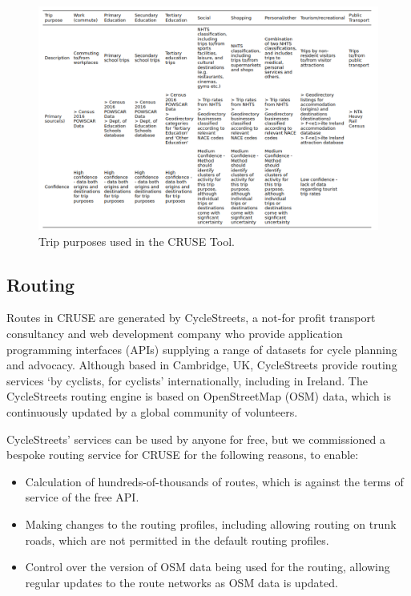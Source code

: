 \documentclass[
  super,
  preprint,
  3p]{elsarticle}
\providecommand{\tightlist}{%
  \setlength{\itemsep}{0pt}\setlength{\parskip}{0pt}}\usepackage{longtable,booktabs,array}
\begin{document}
\begin{figure}

{\centering 

\includegraphics{images/paste-4.png}

}

\caption{\label{fig-trip-purposes}Trip purposes used in the CRUSE Tool.}

\end{figure}

\hypertarget{routing}{%
\subsection{Routing}\label{routing}}

Routes in CRUSE are generated by CycleStreets, a not-for profit
transport consultancy and web development company who provide
application programming interfaces (APIs) supplying a range of datasets
for cycle planning and advocacy. Although based in Cambridge, UK,
CycleStreets provide routing services `by cyclists, for cyclists'
internationally, including in Ireland. The CycleStreets routing engine
is based on OpenStreetMap (OSM) data, which is continuously updated by a
global community of volunteers.

CycleStreets' services can be used by anyone for free, but we
commissioned a bespoke routing service for CRUSE for the following
reasons, to enable:

\begin{itemize}
\tightlist
\item
  Calculation of hundreds-of-thousands of routes, which is against the
  terms of service of the free API.
\item
  Making changes to the routing profiles, including allowing routing on
  trunk roads, which are not permitted in the default routing profiles.
\item
  Control over the version of OSM data being used for the routing,
  allowing regular updates to the route networks as OSM data is updated.
\end{itemize}
\end{document}
